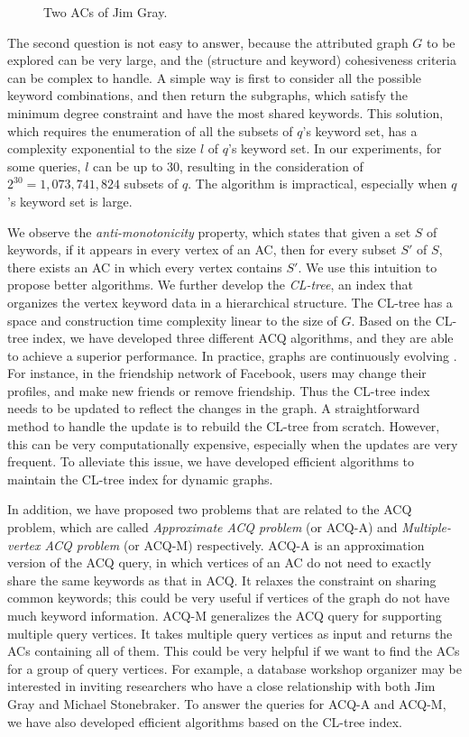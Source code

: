 \begin{figure}[ht]
{{            \label{fig:jim2}
        }
    }
    \caption{Two ACs of Jim Gray.}\label{fig:jim}
\end{figure}

The second question is not easy to answer, because the attributed graph $G$ to be explored can be very large, and the (structure and keyword) cohesiveness criteria can be complex to handle. A simple way is first to consider all the possible keyword combinations, and then return the subgraphs, which satisfy the minimum degree constraint and have the most shared keywords. This solution, which requires the enumeration of all the subsets of $q$'s keyword set, has a complexity exponential to the size $l$ of $q$'s keyword set. In our experiments, for some queries, $l$ can be up to 30, resulting in the consideration of $2^{30}=1,073,741,824$ subsets of $q$. The algorithm is impractical, especially when $q$'s keyword set is large.

{\color{blue}
We observe the {\it anti-monotonicity} property, which states that given a set $S$ of keywords, if it appears in every vertex of an AC, then for every subset $S'$ of $S$, there exists an AC in which every vertex contains $S'$. We use this intuition to propose better algorithms. We further develop the \emph{CL-tree}, an index that organizes the vertex keyword data in a hierarchical structure. The CL-tree has a space and construction time complexity linear to the size of $G$.
Based on the CL-tree index, we have developed three different ACQ algorithms, and they are able to achieve a superior performance.
In practice, graphs are continuously evolving \cite{chenghui,kddEvolving}. For instance, in the friendship network of Facebook, users may change their profiles, and make new friends or remove friendship. Thus the CL-tree index needs to be updated to reflect the changes in the graph. A straightforward method to handle the update is to rebuild the CL-tree from scratch. However, this can be very computationally expensive, especially when the updates are very frequent. To alleviate this issue, we have developed efficient algorithms to maintain the CL-tree index for dynamic graphs.

In addition, we have proposed two problems that are related to the ACQ problem,
which are called {\it Approximate ACQ problem} (or ACQ-A) and {\it Multiple-vertex ACQ problem} (or ACQ-M) respectively.
ACQ-A is an approximation version of the ACQ query, in which vertices of an AC do not need to exactly share the same keywords as that in ACQ. It relaxes the constraint on sharing common keywords; this could be very useful if vertices of the graph do not have much keyword information.
ACQ-M generalizes the ACQ query for supporting multiple query vertices. It takes multiple query vertices as input and returns the ACs containing all of them. This could be very helpful if we want to find the ACs for a group of query vertices. For example, a database workshop organizer may be interested in inviting researchers who have a close relationship with both Jim Gray and Michael Stonebraker.
To answer the queries for ACQ-A and ACQ-M, we have also developed efficient algorithms based on the CL-tree index.
}

